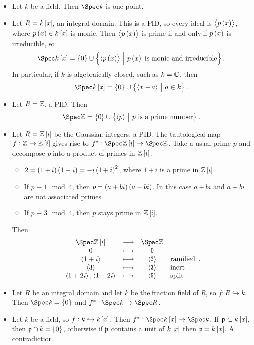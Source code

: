 \begin{example*}
\hfill
\begin{itemize}
\item Let $ k $ be a field. Then $ \Spec k $ is one point.
\item Let $ R = k\sbr{x} $, an integral domain. This is a PID, so every ideal is $ \abr{p\br{x}} $, where $ p\br{x} \in k\sbr{x} $ is monic. Then $ \abr{p\br{x}} $ is prime if and only if $ p\br{x} $ is irreducible, so
$$ \Spec k\sbr{x} = \cbr{0} \cup \cbr{\abr{p\br{x}} \st p\br{x} \ \text{is monic and irreducible}}. $$
In particular, if $ k $ is algebraically closed, such as $ k = \mathbb{C} $, then
$$ \Spec k\sbr{x} = \cbr{0} \cup \cbr{\abr{x - a} \st a \in k}. $$
\item Let $ R = \mathbb{Z} $, a PID. Then
$$ \Spec \ZZ = \cbr{0} \cup \cbr{\abr{p} \st p \ \text{is a prime number}}. $$
\item Let $ R = \ZZ\sbr{i} $ be the Gaussian integers, a PID. The tautological map $ f : \ZZ \to \ZZ\sbr{i} $ gives rise to $ f^* : \Spec \ZZ\sbr{i} \to \Spec \ZZ $. Take a usual prime $ p $ and decompose $ p $ into a product of primes in $ \ZZ\sbr{i} $.
\begin{itemize}
\item $ 2 = \br{1 + i}\br{1 - i} = -i\br{1 + i}^2 $, where $ 1 + i $ is a prime in $ \ZZ\sbr{i} $.
\item If $ p \equiv 1 \mod 4 $, then $ p = \br{a + bi}\br{a - bi} $. In this case $ a + bi $ and $ a - bi $ are not associated primes.
\item If $ p \equiv 3 \mod 4 $, then $ p $ stays prime in $ \ZZ\sbr{i} $.
\end{itemize}
Then
$$
\begin{array}{cccl}
\Spec \ZZ\sbr{i} & \longrightarrow & \Spec \ZZ & \\
0 & \longmapsto & 0 & \\
\abr{1 + i} & \longmapsto & \abr{2} & \text{ramified} \\
\abr{3} & \longmapsto & \abr{3} & \text{inert} \\
\abr{1 + 2i}, \abr{1 - 2i} & \longmapsto & \abr{5} & \text{split}
\end{array}.
$$
\item Let $ R $ be an integral domain and let $ k $ be the fraction field of $ R $, so $ f : R \hookrightarrow k $. Then $ \Spec k = \cbr{0} $ and $ f^* : \Spec k \to \Spec R $.
\item Let $ k $ be a field, so $ f : k \hookrightarrow k\sbr{x} $. Then $ f^* : \Spec k\sbr{x} \to \Spec k $. If $ \ppp \subset k\sbr{x} $, then $ \ppp \cap k = \cbr{0} $, otherwise if $ \mathfrak{p} $ contains a unit of $ k\sbr{x} $ then $ \ppp = k\sbr{x} $. A contradiction.
\end{itemize}
\end{example*}

